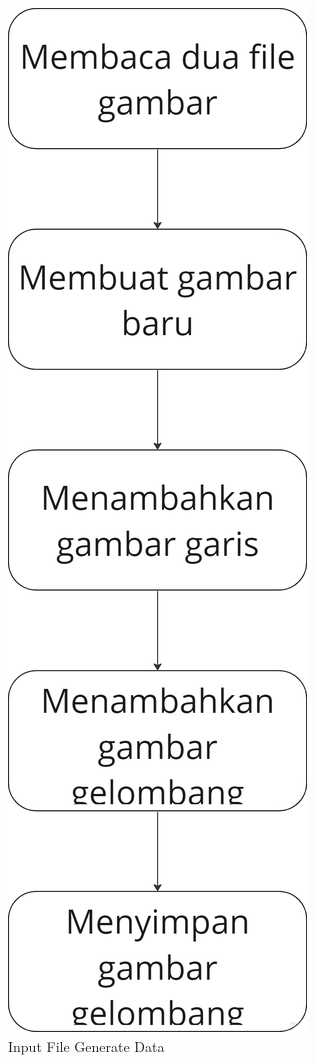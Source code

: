 \begin{minipage}{\linewidth}
  \begin{figure} [H] \centering
    \includegraphics[scale=0.1]{gambar/bab3/generatefloor.png}
    \caption{Input File Generate Data}
    \label{fig:generatefloor}
  \end{figure}
\end{minipage}

